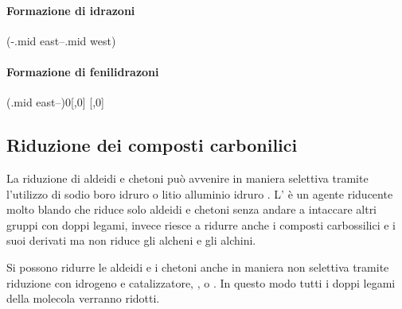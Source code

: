 \paragraph{Formazione di idrazoni}
\begingroup
\begin{reaction}
	\+
	\arrow(-.mid east--.mid west)
	\+ 
\end{reaction}
\endgroup

\paragraph{Formazione di fenilidrazoni}
\begingroup
\chemnameinit{}
\begin{reaction}
	\+{1em,1em}\arrow(.mid east--){0}[,0]
	\arrow
	[,0]\+ 
\end{reaction}
\chemnameinit{}
\endgroup


\subsection{Riduzione dei composti carbonilici}
La riduzione di aldeidi e chetoni può avvenire in maniera selettiva tramite l'utilizzo di sodio boro idruro  o litio alluminio idruro . L' è un agente riducente molto blando che riduce solo aldeidi e chetoni senza andare a intaccare altri gruppi con doppi legami, invece  riesce a ridurre anche i composti carbossilici e i suoi derivati ma non riduce gli alcheni e gli alchini.

Si possono ridurre le aldeidi e i chetoni anche in maniera non selettiva tramite riduzione con idrogeno e catalizzatore, ,  o . In questo modo tutti i doppi legami della molecola verranno ridotti.
